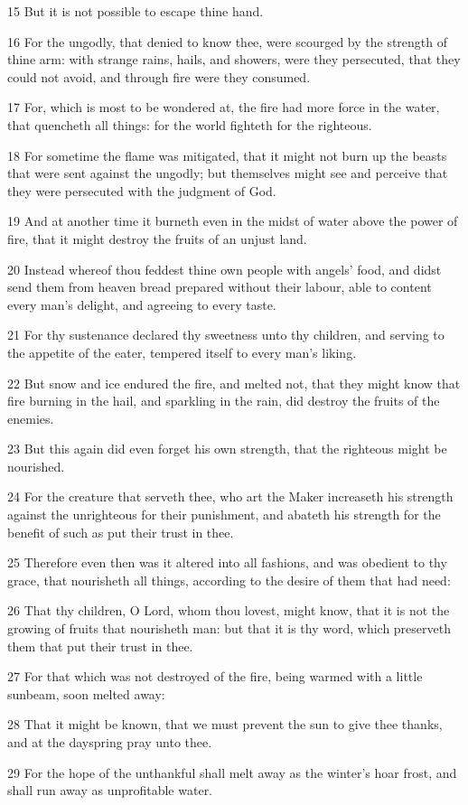 \par 15 But it is not possible to escape thine hand.
\par 16 For the ungodly, that denied to know thee, were scourged by the strength of thine arm: with strange rains, hails, and showers, were they persecuted, that they could not avoid, and through fire were they consumed.
\par 17 For, which is most to be wondered at, the fire had more force in the water, that quencheth all things: for the world fighteth for the righteous.
\par 18 For sometime the flame was mitigated, that it might not burn up the beasts that were sent against the ungodly; but themselves might see and perceive that they were persecuted with the judgment of God.
\par 19 And at another time it burneth even in the midst of water above the power of fire, that it might destroy the fruits of an unjust land.
\par 20 Instead whereof thou feddest thine own people with angels' food, and didst send them from heaven bread prepared without their labour, able to content every man's delight, and agreeing to every taste.
\par 21 For thy sustenance declared thy sweetness unto thy children, and serving to the appetite of the eater, tempered itself to every man's liking.
\par 22 But snow and ice endured the fire, and melted not, that they might know that fire burning in the hail, and sparkling in the rain, did destroy the fruits of the enemies.
\par 23 But this again did even forget his own strength, that the righteous might be nourished.
\par 24 For the creature that serveth thee, who art the Maker increaseth his strength against the unrighteous for their punishment, and abateth his strength for the benefit of such as put their trust in thee.
\par 25 Therefore even then was it altered into all fashions, and was obedient to thy grace, that nourisheth all things, according to the desire of them that had need:
\par 26 That thy children, O Lord, whom thou lovest, might know, that it is not the growing of fruits that nourisheth man: but that it is thy word, which preserveth them that put their trust in thee.
\par 27 For that which was not destroyed of the fire, being warmed with a little sunbeam, soon melted away:
\par 28 That it might be known, that we must prevent the sun to give thee thanks, and at the dayspring pray unto thee.
\par 29 For the hope of the unthankful shall melt away as the winter's hoar frost, and shall run away as unprofitable water.

